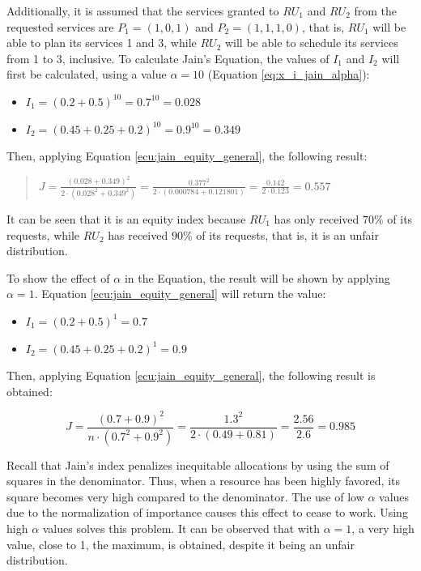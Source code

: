 \documentclass[preprint,12pt]{elsarticle}
\begin{document}
Additionally, it is assumed that the services granted to $RU_1$ and $RU_2$ from the requested services are $P_1 = (1,0,1)$ and $P_2 = (1,1,1,0)$, that is, $RU_1$ will be able to plan its services 1 and 3, while $RU_2$ will be able to schedule its services from 1 to 3, inclusive. To calculate Jain's Equation, the values of $I_1$ and $I_2$ will first be calculated, using a value $\alpha=10$ (Equation \ref{eq:x_i_jain_alpha}):
\begin{itemize}
    \item $I_1 = (0.2+0.5)^{10} = 0.7^{10} = 0.028$
    \item $I_2 = (0.45+0.25+0.2)^{10} = 0.9^{10} = 0.349$
\end{itemize}


Then, applying Equation \ref{ecu:jain_equity_general}, the following result:

\begin{quote}
    $ J = \frac{(0.028+0.349)^2}{2 \cdot (0.028^2+0.349^2)}= \frac{0.377^2}{2 \cdot (0.000784+0.121801)} = \frac{0.142}{2\cdot0.123} = 0.557 $
\end{quote}


It can be seen that it is an equity index because $RU_1$ has only received $70\%$ of its requests, while $RU_2$ has received $90\%$ of its requests, that is, it is an unfair distribution.

To show the effect of $\alpha$ in the Equation, the result will be shown by applying $\alpha=1$. Equation \ref{ecu:jain_equity_general} will return the value:
\begin{itemize}
    \item $I_1 = (0.2+0.5)^{1} = 0.7$
    \item $I_2 = (0.45+0.25+0.2)^{1} = 0.9$
\end{itemize}

Then, applying Equation \ref{ecu:jain_equity_general}, the following result is obtained:

$$J = \frac{(0.7+0.9)^2}{n\cdot(0.7^2+0.9^2)} = \frac{1.3^2}{2\cdot(0.49+0.81)} = \frac{2.56}{2.6} = 0.985 $$


Recall that Jain's index penalizes inequitable allocations by using the sum of squares in the denominator. Thus, when a resource has been highly favored, its square becomes very high compared to the denominator. The use of low $\alpha$ values due to the normalization of importance causes this effect to cease to work. Using high $\alpha$ values solves this problem. It can be observed that with $\alpha=1$, a very high value, close to 1, the maximum, is obtained, despite it being an unfair distribution.
\end{document}
